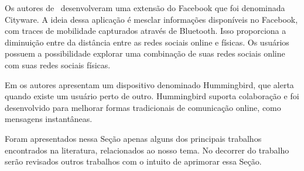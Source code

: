 Os autores de~\cite{SocialNetworking} desenvolveram uma extensão
do Facebook que foi denominada Cityware. A ideia dessa aplicação é
mesclar informações disponíveis no Facebook, com traces de
mobilidade capturados através de Bluetooth. Isso proporciona a
diminuição entre da distância entre as redes sociais online e
físicas. Os usuários possuem a possibilidade explorar uma
combinação de suas redes sociais online com suas redes sociais físicas.

Em \cite{Hummingbird} os autores apresentam um dispositivo denominado
Hummingbird, que alerta quando existe um usuário perto de outro.
Hummingbird suporta colaboração e foi desenvolvido para melhorar formas
tradicionais de comunicação online, como mensagens instantâneas.

Foram apresentados nessa Seção apenas alguns dos principais trabalhos
encontrados na literatura, relacionados ao nosso tema. No decorrer do
trabalho serão revisados outros trabalhos com o intuito de
aprimorar essa Seção.
